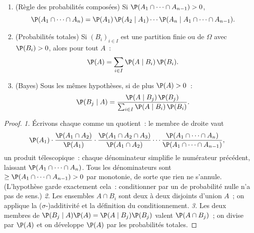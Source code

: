 \begin{theorem}\label{thm:b2:proba:bayes}
\leavevmode
\begin{enumerate}
\item (Règle des probabilités composées) Si $\P(A_1 \cap \dots \cap A_{n-1}) > 0$,
\[
\P(A_1 \cap \dots \cap A_n)
= \P(A_1)\,\P(A_2 \mid A_1)\cdots
\P(A_n \mid A_1 \cap \dots \cap A_{n-1}) .
\]
\item (Probabilités totales) Si $(B_i)_{i \in I}$ est une partition finie ou
 de $\Omega$ avec $\P(B_i) > 0$, alors pour tout
 $A$~:
\[
\P(A) = \sum_{i \in I} \P(A \mid B_i)\,\P(B_i) .
\]
\item (Bayes) Sous les mêmes hypothèses, si de plus $\P(A) > 0$~:
\[
\P(B_j \mid A)
= \frac{\P(A \mid B_j)\,\P(B_j)}
       {\sum_{i \in I} \P(A \mid B_i)\,\P(B_i)} .
\]
\end{enumerate}
\end{theorem}

\begin{proof}
\emph{1.} Écrivons chaque  comme un quotient~:
le membre de droite vaut
\[
\P(A_1)\cdot\frac{\P(A_1 \cap A_2)}{\P(A_1)}\cdot
\frac{\P(A_1 \cap A_2 \cap A_3)}{\P(A_1 \cap A_2)}\cdots
\frac{\P(A_1 \cap \dots \cap A_n)}{\P(A_1 \cap \dots \cap
A_{n-1})},
\]
un produit télescopique~: chaque dénominateur simplifie le numérateur
précédent, laissant $\P(A_1 \cap \dots \cap A_n)$.
Tous les dénominateurs sont $\geq \P(A_1 \cap \dots \cap A_{n-1}) >
0$ par monotonie, de sorte que rien ne s'annule. (L'hypothèse
garde exactement cela~: conditionner par un  de probabilité
nulle n'a pas de sens.)
\emph{2.} Les ensembles $A \cap B_i$ sont deux à deux disjoints d'union
$A$~; on applique la ($\sigma$-)additivité et la définition du
conditionnement.
\emph{3.} Les deux membres de $\P(B_j \mid A)\P(A) = \P(A \mid
B_j)\P(B_j)$ valent $\P(A \cap B_j)$~; on divise par $\P(A)$ et on
développe $\P(A)$ par les probabilités totales.
\end{proof}

